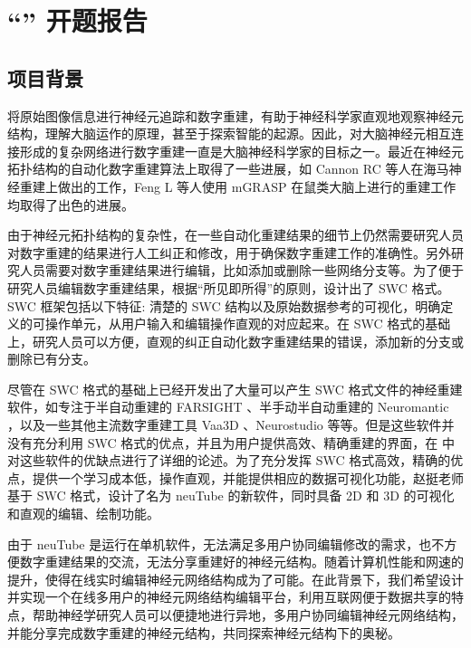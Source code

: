 \chapter*{``\zjutitlec'' 开题报告}

\section{项目背景}
将原始图像信息进行神经元追踪和数字重建，有助于神经科学家直观地观察神经元结构，理解大脑运作的原理，甚至于探索智能的起源。因此，对大脑神经元相互连接形成的复杂网络进行数字重建一直是大脑神经科学家的目标之一。最近在神经元拓扑结构的自动化数字重建算法上取得了一些进展，如 Cannon RC 等人在海马神经重建上做出的工作\cite{Cannon1998An}，Feng L 等人使用 mGRASP 在鼠类大脑上进行的重建工作\cite{Druckmann2014Structured}均取得了出色的进展。

由于神经元拓扑结构的复杂性，在一些自动化重建结果的细节上仍然需要研究人员对数字重建的结果进行人工纠正和修改，用于确保数字重建工作的准确性。另外研究人员需要对数字重建结果进行编辑，比如添加或删除一些网络分支等。为了便于研究人员编辑数字重建结果，根据“所见即所得”的原则，设计出了 SWC 格式\cite{Peng2011Proof}。SWC 框架包括以下特征: 清楚的 SWC 结构以及原始数据参考的可视化，明确定义的可操作单元，从用户输入和编辑操作直观的对应起来。在 SWC 格式的基础上，研究人员可以方便，直观的纠正自动化数字重建结果的错误，添加新的分支或删除已有分支。

尽管在 SWC 格式的基础上已经开发出了大量可以产生 SWC 格式文件的神经重建软件，如专注于半自动重建的 FARSIGHT \cite{Luisi2011The}、半手动半自动重建的 Neuromantic \cite{Myatt2012Neuromantic}，以及一些其他主流数字重建工具 Vaa3D \cite{Peng2010Seeing}、Neurostudio \cite{Rodriguez2006Rayburst} 等等。但是这些软件并没有充分利用 SWC 格式的优点，并且为用户提供高效、精确重建的界面，在 \cite{Feng2014neuTube} 中对这些软件的优缺点进行了详细的论述。为了充分发挥 SWC 格式高效，精确的优点，提供一个学习成本低，操作直观，并能提供相应的数据可视化功能，赵挺老师基于 SWC 格式，设计了名为 neuTube 的新软件\cite{Feng2014neuTube}，同时具备 2D 和 3D 的可视化和直观的编辑、绘制功能。

由于 neuTube 是运行在单机软件，无法满足多用户协同编辑修改的需求，也不方便数字重建结果的交流，无法分享重建好的神经元结构。随着计算机性能和网速的提升，使得在线实时编辑神经元网络结构成为了可能。在此背景下，我们希望设计并实现一个在线多用户的神经元网络结构编辑平台，利用互联网便于数据共享的特点，帮助神经学研究人员可以便捷地进行异地，多用户协同编辑神经元网络结构，并能分享完成数字重建的神经元结构，共同探索神经元结构下的奥秘。

